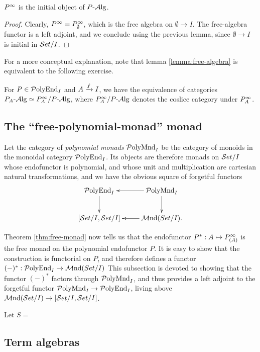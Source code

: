 \begin{corollary}
    $P^\moo$ is the initial object of $P\alg$.
\end{corollary}
\begin{proof}
    Clearly, $P^\moo=P_\emptyset^\moo$, which is the free algebra on
    $\emptyset\to I$. The free-algebra functor is a left adjoint, and we
    conclude using the previous lemma, since $\emptyset\to I$ is initial in
    $\Set/I$.
\end{proof}


For a more conceptual explanation, note that lemma \ref{lemma:free-algebra} is
equivalent to the following exercise.
\begin{exercise}
    For $P\in\PolyEnd_I$ and $A\xto{f} I$, we have the equivalence of categories
    $P_A\alg\simeq P_A^\moo/P\alg$, where $P_A^\moo/P\alg$ denotes the coslice
    category under $P_A^\moo$.
\end{exercise}

\subsection{The ``free-polynomial-monad'' monad}
Let the category of \emph{polynomial monads} $\PolyMnd_I$ be the category of
monoids in the monoidal category $\PolyEnd_I$. Its objects are therefore monads
on $\Set/I$ whose endofunctor is polynomial, and whose unit and multiplication
are cartesian natural transformations, and we have the obvious square of
forgetful functors
\[
    \xymatrix{
      \PolyEnd_I\ar[d]
      &\PolyMnd_I\ar[l]\ar[d]\\
      [\Set/I,\Set/I]
      &\Mnd(Set/I).\ar[l]
    }
\]

Theorem \ref{thm:free-monad} now tells us that the endofunctor
$P^*:A\mapsto P_{(A)}^\moo$ is the free monad on the polynomial endofunctor $P$.
It is easy to show that the construction is functorial on $P$, and therefore
defines a functor $(-)^*:\PolyEnd_I\to\Mnd(Set/I)$
This subsection is devoted to showing that the functor $(-)^*$ factors through
$\PolyMnd_I$, and thus provides a left adjoint to the forgetful functor
$\PolyMnd_I\to\PolyEnd_I$, living above $\Mnd(\Set/I)\to[\Set/I,\Set/I]$. 

\begin{lemma}
    Let $S=$
\end{lemma}

\subsection{Term algebras}




